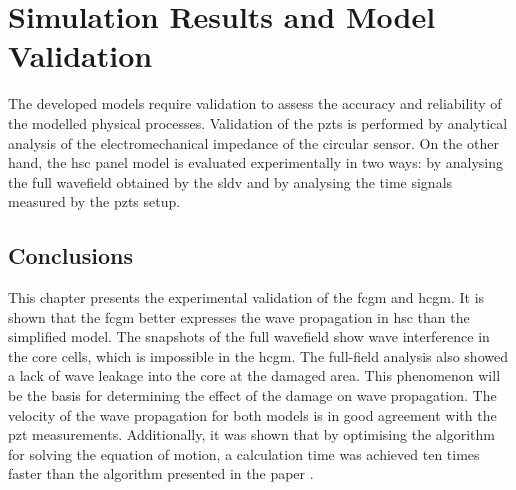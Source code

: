 
\chapter[Simulation Results and Model Validation]{Simulation Results and Model Validation}
\label{ch:validation}

The developed models require validation to assess the accuracy and reliability of the modelled physical processes.
Validation of the \acp{pzt} is performed by analytical analysis of the electromechanical impedance of the circular sensor. 
On the other hand, the \ac{hsc} panel model is evaluated experimentally in two ways: by analysing the full wavefield obtained by the \ac{sldv} and by analysing the time signals measured by the \acp{pzt} setup.




\section{Conclusions}
\label{sec:conclusionsValid}

This chapter presents the experimental validation of the \ac{fcgm} and \ac{hcgm}.
It is shown that the \ac{fcgm} better expresses the wave propagation in \ac{hsc} than the simplified model.
The snapshots of the full wavefield show wave interference in the core cells, which is impossible in the \ac{hcgm}.
The full-field analysis also showed a lack of wave leakage into the core at the damaged area.
This phenomenon will be the basis for determining the effect of the damage on wave propagation.
The velocity of the wave propagation for both models is in good agreement with the \ac{pzt} measurements.
Additionally, it was shown that by optimising the algorithm for solving the equation of motion, a calculation time was achieved ten times faster than the algorithm presented in the paper \cite{kudela2020parallel}.
